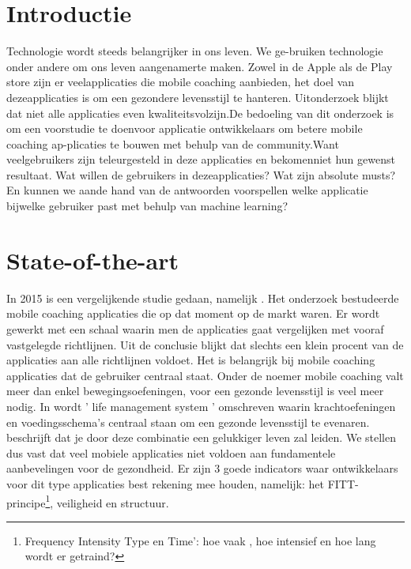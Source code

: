 
\section{Introductie} %
\label{sec:introductie}

Technologie wordt steeds belangrijker in ons leven.  We ge-bruiken technologie onder andere om ons leven aangenamerte maken.  Zowel in de Apple als de Play store zijn er veelapplicaties die mobile coaching aanbieden, het doel van dezeapplicaties is om een gezondere levensstijl te hanteren.  Uitonderzoek blijkt dat niet alle applicaties even kwaliteitsvolzijn.De bedoeling van dit onderzoek is om een voorstudie te doenvoor applicatie ontwikkelaars om betere mobile coaching ap-plicaties te bouwen met behulp van de community.Want veelgebruikers zijn teleurgesteld in deze applicaties en bekomenniet hun gewenst resultaat. Wat willen de gebruikers in dezeapplicaties?  Wat zijn absolute musts?  En kunnen we aande hand van de antwoorden voorspellen welke applicatie bijwelke gebruiker past met behulp van machine learning?


\section{State-of-the-art}
\label{sec:state-of-the-art}

In 2015 is een vergelijkende studie gedaan, namelijk \textcite{JMIR2015}. Het onderzoek bestudeerde mobile coaching applicaties die op dat moment op de markt waren. Er wordt gewerkt met een schaal waarin men de applicaties gaat vergelijken met vooraf vastgelegde richtlijnen. Uit de conclusie blijkt dat slechts een klein procent van de applicaties aan alle richtlijnen voldoet. Het is belangrijk bij mobile coaching applicaties dat de gebruiker centraal staat. \hfill  \break\break
Onder de noemer mobile coaching valt meer dan enkel bewegingsoefeningen, voor een gezonde levensstijl is veel meer nodig. In \textcite{EQUILIBRIO2005}  wordt ' life management system ' omschreven waarin krachtoefeningen en voedingsschema's centraal staan om een gezonde levensstijl te evenaren.\textcite{EQUILIBRIO2005} beschrijft dat je door deze combinatie een gelukkiger leven zal leiden. \hfill\break
 \break
We stellen dus vast dat veel mobiele applicaties niet voldoen aan fundamentele aanbevelingen voor de gezondheid. Er zijn 3 goede indicators waar ontwikkelaars voor dit type applicaties best rekening mee houden, namelijk: het FITT-principe\footnote{Frequency Intensity Type en Time’: hoe vaak , hoe intensief en hoe lang wordt er getraind?
}, veiligheid en structuur.

